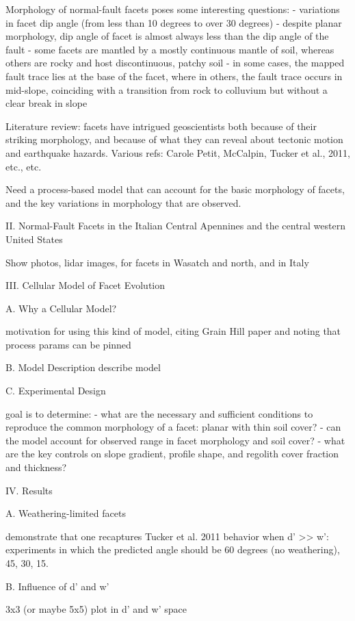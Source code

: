 Morphology of normal-fault facets poses some interesting questions:
- variations in facet dip angle (from less than 10 degrees to over 30 degrees)
- despite planar morphology, dip angle of facet is almost always less than the dip angle of the fault
- some facets are mantled by a mostly continuous mantle of soil, whereas others are rocky and host discontinuous, patchy soil
- in some cases, the mapped fault trace lies at the base of the facet, where in others, the fault trace occurs in mid-slope, coinciding with a transition from rock to colluvium but without a clear break in slope

Literature review: facets have intrigued geoscientists both because of their striking morphology, and because of what they can reveal about tectonic motion and earthquake hazards. Various refs: Carole Petit, McCalpin, Tucker et al., 2011, etc., etc.

Need a process-based model that can account for the basic morphology of facets, and the key variations in morphology that are observed.


II. Normal-Fault Facets in the Italian Central Apennines and the central western United States

Show photos, lidar images, for facets in Wasatch and north, and in Italy


III. Cellular Model of Facet Evolution

A. Why a Cellular Model?

motivation for using this kind of model, citing Grain Hill paper and noting that process params can be pinned

B. Model Description
describe model

C. Experimental Design

goal is to determine:
- what are the necessary and sufficient conditions to reproduce the common morphology of a facet: planar with thin soil cover?
- can the model account for observed range in facet morphology and soil cover?
- what are the key controls on slope gradient, profile shape, and regolith cover fraction and thickness?


IV. Results

A. Weathering-limited facets

demonstrate that one recaptures Tucker et al. 2011 behavior when d' >> w': experiments in which the predicted angle should be 60 degrees (no weathering), 45, 30, 15.

B. Influence of d' and w'

3x3 (or maybe 5x5) plot in d' and w' space

